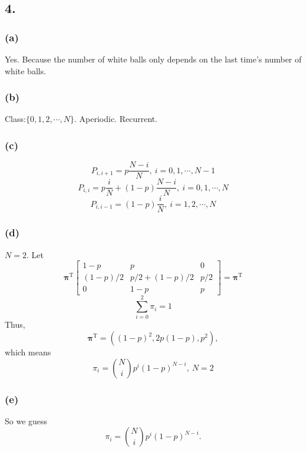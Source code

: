 \documentclass{article}
\begin{document}
\subsection*{4.}
\subsubsection*{(a)} 
Yes. Because the number of white balls only depends on the last time's number of white balls.
\subsubsection*{(b)}
Class:$\{0,1,2,\cdots,N\}$. Aperiodic. Recurrent.
\subsubsection*{(c)}
$$P_{i,i+1}=p\frac{N-i}{N},\ i=0,1,\cdots,N-1$$
$$P_{i,i}=p\frac{i}{N}+(1-p)\frac{N-i}{N},\ i=0,1,\cdots,N$$
$$P_{i,i-1}=(1-p)\frac{i}{N},\ i=1,2,\cdots,N$$
\subsubsection*{(d)}
$N=2$. Let
$$\bm{\pi}^{\mathrm{T}}\left[
\begin{matrix}
1-p&p&0\\
(1-p)/2&p/2+(1-p)/2&p/2\\
0&1-p&p
\end{matrix}
\right]
=\bm{\pi}^{\mathrm{T}}$$
$$\sum_{i=0}^{2}\pi_{i}=1$$
Thus,$$\bm{\pi}^{\mathrm{T}}=((1-p)^{2},2p(1-p),p^{2}),$$ which means $$\pi_{i}=\binom{N}{i}p^{i}(1-p)^{N-i},\ N=2$$
\subsubsection*{(e)}
So we guess $$\pi_{i}=\binom{N}{i}p^{i}(1-p)^{N-i}.$$
\end{document}
